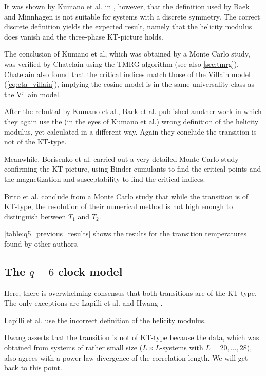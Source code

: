 It was shown by Kumano et al.
in \cite{kumano2013response}, however, that the definition used by Baek and Minnhagen is not suitable for systems with a
discrete symmetry.
The correct discrete definition yields the expected result, namely that the helicity modulus does vanish and the
three-phase KT-picture holds.

The conclusion of Kumano et al, which was obtained by a Monte Carlo study,
was verified by Chatelain \cite{chatelain2014dmrg} using the TMRG algorithm \cite{nishino1995density} (see also
\autoref{sec:tmrg}).
Chatelain also found that the critical indices match those of the Villain model (\autoref{eq:eta_villain}),
implying the cosine model is in the same universality class as the Villain model.

After the rebuttal by Kumano et al., Baek et al.
published another work \cite{baek2013residual} in which they again use the (in the eyes of Kumano et al.) wrong
definition of the helicity modulus, yet calculated in a different way.
Again they conclude the transition is not of the KT-type.

Meanwhile, Borisenko et al.
\cite{borisenko2011numerical} carried out a very detailed Monte Carlo study confirming the KT-picture,
using Binder-cumulants to find the critical points and the magnetization and susceptability to find the critical
indices.

Brito et al.
\cite{brito2010twodimensional} conclude from a Monte Carlo study that while the transition is of KT-type,
the resolution of their numerical method is not high enough to distinguish between $T_1$ and $T_2$.

\autoref{table:q5_previous_results} shows the results for the transition temperatures found by other authors.

\subsection{The $q = 6$ clock model}

Here, there is overwhelming consensus that both transitions are of the KT-type.
The only exceptions are Lapilli et al. \cite{lapilli2006universality} and Hwang \cite{hwang2009six}.

Lapilli et al. use the incorrect definition of the helicity modulus.

Hwang asserts that the transition is not of KT-type because the data,
which was obtained from systems of rather small size ($L \times L$-systems with $L = 20,
\dots, 28$), also agrees with a power-law divergence of the correlation length. We will get back to this point.

